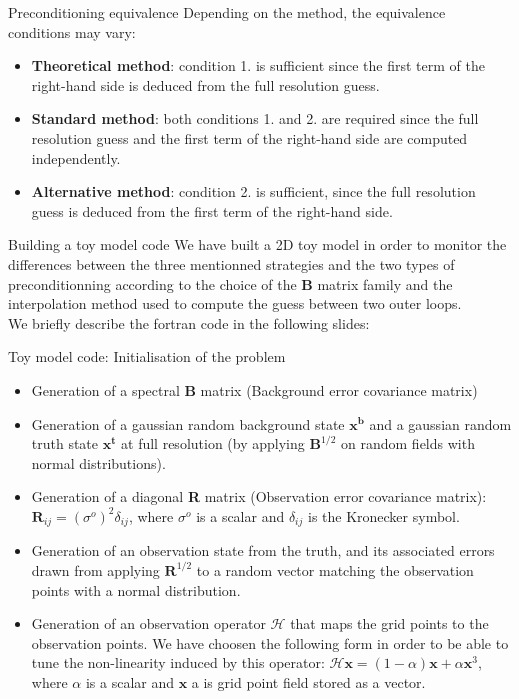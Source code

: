 \documentclass[8pt]{beamer}
\begin{document}
\begin{frame}{Preconditioning equivalence}
 Depending on the method, the equivalence conditions may vary:
\begin{itemize}
\item \textbf{Theoretical method}: condition 1. is sufficient since the first term of the right-hand side is deduced from the full resolution guess.
\item \textbf{Standard method}: both conditions 1. and 2. are required since the full resolution guess and the first term of the right-hand side are computed independently.
\item \textbf{Alternative method}: condition 2. is sufficient, since the full resolution guess is deduced from the first term of the right-hand side.
\end{itemize}
\end{frame}




\begin{frame}{Building a toy model code}
 We have built a 2D toy model in order to monitor the differences between the three mentionned strategies and the two types of preconditionning according to the choice of the $\mathbf{B}$ matrix family and the interpolation method used to compute the guess between two outer loops.\\
 We briefly describe the fortran code in the following slides:
\end{frame} 
 
 \begin{frame}{Toy model code: Initialisation of the problem}
 \begin{itemize}
  \item Generation of a spectral \textbf{B} matrix (Background error covariance matrix)
  \item Generation of a gaussian random background state $\mathbf{x^b}$ and a gaussian random truth state $\mathbf{x^t}$ at full resolution (by applying $\mathbf{B}^{1/2}$ on random fields with normal distributions).
  \item Generation of a diagonal \textbf{R} matrix (Observation error covariance matrix): $\mathbf{R}_{ij}=(\sigma^o)^2 \delta_{ij}$, where $\sigma^o$ is a scalar and $\delta_{ij}$ is the  Kronecker symbol.
  \item Generation of an observation state from the truth, and its associated errors drawn from applying $\mathbf{R}^{1/2}$ to a random vector matching the observation points with a normal distribution.
  \item Generation of an observation operator $\mathcal{H}$ that maps the grid points to the observation points. We have choosen the following form in order to be able to tune the non-linearity induced by this operator: $\mathcal{H}\mathbf{x} = (1-\alpha)\mathbf{x}+\alpha \mathbf{x}^3$, where $\alpha$ is a scalar and $\mathbf{x}$ a is grid point field stored as a vector.
 \end{itemize}
\end{frame}
\end{document}
